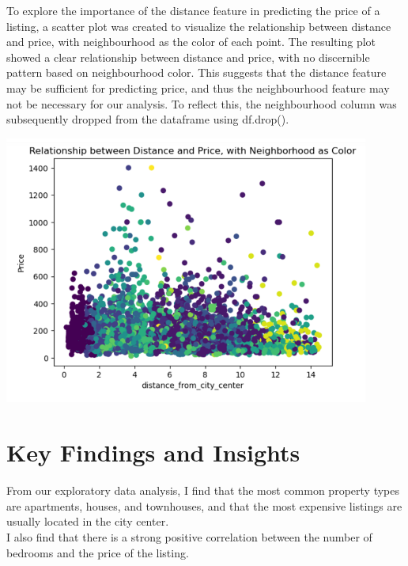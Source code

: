 \documentclass{article}
\begin{document}
To explore the importance of the distance feature in predicting the price of a listing, a scatter plot was created to visualize the relationship between distance and price, with neighbourhood as the color of each point. The resulting plot showed a clear relationship between distance and price, with no discernible pattern based on neighbourhood color. This suggests that the distance feature may be sufficient for predicting price, and thus the neighbourhood feature may not be necessary for our analysis. To reflect this, the neighbourhood column was subsequently dropped from the dataframe using df.drop().

\begin{center}
    \includegraphics[width=0.9\textwidth,height=0.4\textheight]{distance_price.png}
    \captionsetup{justification=centering}
\end{center}

\section{Key Findings and Insights}
From our exploratory data analysis, I find that the most common property types are apartments, houses, and townhouses, and that the most expensive listings are usually located in the city center.\\
I also find that there is a strong positive correlation between the number of bedrooms and the price of the listing. 
\end{document}
